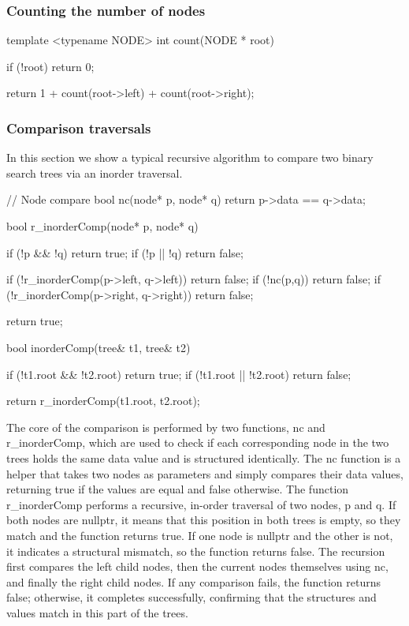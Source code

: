 \documentclass{report}
\begin{document}
    \pagebreak 
    \subsubsection{Counting the number of nodes}
    \bigbreak \noindent 
    \begin{cppcode}
        template <typename NODE>
        int count(NODE * root) {
            if (!root) return 0;

            return 1 + count(root->left) + count(root->right);
        }

    \end{cppcode}

    \bigbreak \noindent 
    \subsubsection{Comparison traversals}
    \bigbreak \noindent 
    In this section we show a typical recursive algorithm to compare two binary search trees via an inorder traversal.
    \bigbreak \noindent 
    \begin{cppcode}
        // Node compare
        bool nc(node* p, node* q) {
            return p->data == q->data;
        }

        bool r_inorderComp(node* p, node* q) {
            if (!p && !q) return true;
            if (!p || !q) return false;

            if (!r_inorderComp(p->left, q->left)) return false;
            if (!nc(p,q)) return false;
            if (!r_inorderComp(p->right, q->right)) return false;

            return true;

        }

        bool inorderComp(tree& t1, tree& t2) {

            if (!t1.root && !t2.root) return true;
            if (!t1.root || !t2.root) return false;

            return r_inorderComp(t1.root, t2.root);
        }
    \end{cppcode}
    \bigbreak \noindent 
    The core of the comparison is performed by two functions, nc and r\_inorderComp, which are used to check if each corresponding node in the two trees holds the same data value and is structured identically.
    \bigbreak \noindent 
    The nc function is a helper that takes two nodes as parameters and simply compares their data values, returning true if the values are equal and false otherwise.
    \bigbreak \noindent 
    The function r\_inorderComp performs a recursive, in-order traversal of two nodes, p and q. If both nodes are nullptr, it means that this position in both trees is empty, so they match and the function returns true. If one node is nullptr and the other is not, it indicates a structural mismatch, so the function returns false. The recursion first compares the left child nodes, then the current nodes themselves using nc, and finally the right child nodes. If any comparison fails, the function returns false; otherwise, it completes successfully, confirming that the structures and values match in this part of the trees.
\end{document}
